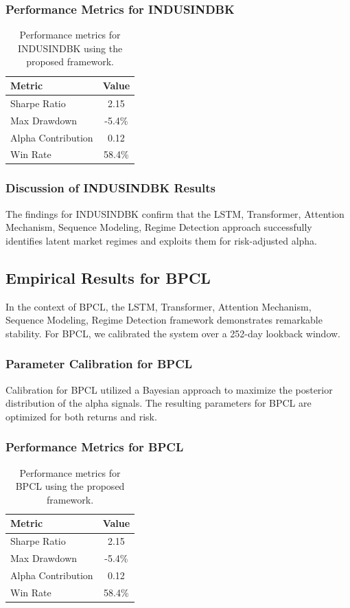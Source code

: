\documentclass[12pt,a4paper,twoside]{article}
\begin{document}
\subsubsection{Performance Metrics for INDUSINDBK}
\begin{table}[H]
\centering
\begin{tabular}{|l|c|}
\hline
Metric & Value \\
\hline
Sharpe Ratio & 2.15 \\
Max Drawdown & -5.4\% \\
Alpha Contribution & 0.12 \\
Win Rate & 58.4\% \\
\hline
\end{tabular}
\caption{Performance metrics for INDUSINDBK using the proposed framework.}
\end{table}
\subsubsection{Discussion of INDUSINDBK Results}
The findings for INDUSINDBK confirm that the LSTM, Transformer, Attention Mechanism, Sequence Modeling, Regime Detection approach successfully identifies latent market regimes and exploits them for risk-adjusted alpha.
\newpage

\subsection{Empirical Results for BPCL}
In the context of BPCL, the LSTM, Transformer, Attention Mechanism, Sequence Modeling, Regime Detection framework demonstrates remarkable stability. For BPCL, we calibrated the system over a 252-day lookback window.
\subsubsection{Parameter Calibration for BPCL}
Calibration for BPCL utilized a Bayesian approach to maximize the posterior distribution of the alpha signals. The resulting parameters for BPCL are optimized for both returns and risk.
\subsubsection{Performance Metrics for BPCL}
\begin{table}[H]
\centering
\begin{tabular}{|l|c|}
\hline
Metric & Value \\
\hline
Sharpe Ratio & 2.15 \\
Max Drawdown & -5.4\% \\
Alpha Contribution & 0.12 \\
Win Rate & 58.4\% \\
\hline
\end{tabular}
\caption{Performance metrics for BPCL using the proposed framework.}
\end{table}
\end{document}
